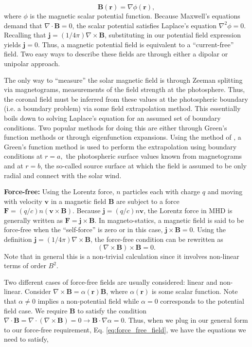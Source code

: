 \begin{enumerate}
\begin{enumerate}
				\begin{equation}
					\label{eq:potential field}
					\mathbf{B}(\mathbf{r}) = \nabla\phi(\mathbf{r}),
				\end{equation}
				where $\phi$ is the magnetic scalar potential function. Because Maxwell's equations demand that $\nabla\cdot\mathbf{B}=0$, the scalar potential satisfies Laplace's equation $\nabla^2\phi=0$. Recalling that $\mathbf{j}=(1/4\pi)\nabla\times\mathbf{B}$, substituting in our potential field expression yields $\mathbf{j}=0$. Thus, a magnetic potential field is equivalent to a ``current-free'' field. Two easy ways to describe these fields are through either a dipolar or unipolar approach. 
				\par The only way to ``measure'' the solar magnetic field is through Zeeman splitting via magnetograms, measurements of the field strength at the photosphere. Thus, the coronal field must be inferred from these values at the photospheric boundary (i.e. a boundary problem) via some field extrapolation method. This essentially boils down to solving Laplace's equation for an assumed set of boundary conditions. Two popular methods for doing this are either through Green's function methods or through eigenfunction expansions. Using the method of \citet{sakurai_greens_1982}, a Green's function method is used to perform the extrapolation using boundary conditions at $r=a,$ the photospheric surface values known from magnetograms and at $r=b$, the so-called source surface at which the field is assumed to be only radial and connect with the solar wind.
				\par\textbf{Force-free:} Using the Lorentz force, $n$ particles each with charge $q$ and moving with velocity $\mathbf{v}$ in a magnetic field $\mathbf{B}$ are subject to a force $\mathbf{F}=(q/c)n(\mathbf{v}\times\mathbf{B})$. Because $\mathbf{j}=(q/c)n\mathbf{v}$, the Lorentz force in MHD is generally written as $\mathbf{F}=\mathbf{j}\times\mathbf{B}$. In magneto-statics, a magnetic field is said to be force-free when the ``self-force'' is zero or in this case, $\mathbf{j}\times\mathbf{B}=0$. Using the definition $\mathbf{j}=(1/4\pi)\nabla\times\mathbf{B}$, the force-free condition can be rewritten as 
				\begin{equation}
					\label{eq:force_free_field}
					(\nabla\times\mathbf{B})\times\mathbf{B} = 0.
				\end{equation}
				Note that in general this is a non-trivial calculation since it involves non-linear terms of order $B^2$.
				\par Two different cases of force-free fields are usually considered: linear and non-linear. Consider $\nabla\times\mathbf{B}=\alpha(\mathbf{r})\mathbf{B}$, where $\alpha(\mathbf{r})$ is some scalar function. Note that $\alpha\neq0$ implies a non-potential field while $\alpha=0$ corresponds to the potential field case. We require $\mathbf{B}$ to satisfy the condition  $\nabla\cdot\mathbf{B}=\nabla\cdot(\nabla\times\mathbf{B})=0\rightarrow\mathbf{B}\cdot\nabla\alpha=0$. Thus, when we plug in our general form to our force-free requirement, Eq. \ref{eq:force_free_field}, we have the equations we need to satisfy,

\end{enumerate}
\end{enumerate}
